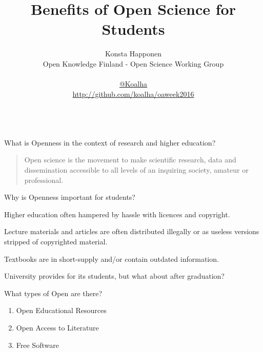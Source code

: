 \documentclass{beamer}
\title{Benefits of Open Science for Students}
\author{\parbox{\textwidth}{Konsta Happonen\\
    Open Knowledge Finland - Open Science Working Group\\
    \\
    \href{http://twitter.com/koalha}{@Koalha}\\
    \url{http://github.com/koalha/oaweek2016}}\\
}
\date{}
\begin{document}
\maketitle


\begin{frame}{What is Openness in the context of research and higher education?}

  \begin{quote}
    Open science is the movement to make scientific research, data and dissemination accessible to all levels of an inquiring society, amateur or professional.\\
  \end{quote}

\end{frame}

\begin{frame}{Why is Openness important for students?}

  Higher education often hampered by hassle with licences and copyright.

  Lecture materials and articles are often distributed illegally or as useless versions stripped of copyrighted material.

  Textbooks are in short-supply and/or contain outdated information.

  University provides for its students, but what about after graduation?

\end{frame}

\begin{frame}{What types of Open are there?}
  \begin{enumerate}
  \item Open Educational Resources
  \item Open Access to Literature
  \item Free Software
  \end{enumerate}
\end{frame}
\end{document}

